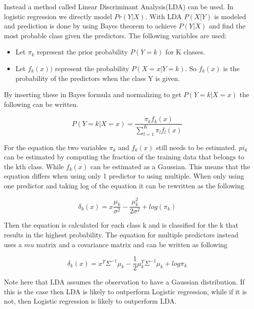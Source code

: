 Instead a method called Linear Discriminant Analysis(LDA) can be used. In logistic regression we directly model $Pr(Y|X)$. With LDA $P(X|Y)$ is modeled and prediction is done by using Bayes theorem to achieve $P(Y|X)$ and find the most probable class given the predictors. The following variables are used:

\begin{itemize}
	\item Let $\pi_k$ represent the prior probability $P(Y=k)$ for K classes.
	\item Let $f_k(x))$ represent the probability $P(X=x|Y=k)$. So $f_k(x)$ is the probability of the predictors when the class Y is given.
\end{itemize} 

By inserting these in Bayes formula and normalizing to get $P(Y=k|X=x)$ the following can be written.

\begin{equation}
P(Y=k|X = x) = \dfrac{\pi_k f_k(x)}{\sum_{l=1}^{K} \pi_l f_l(x)}
\end{equation}

For the equation the two variables $\pi_k$ and $f_k(x)$ still needs to be estimated. $pi_k$ can be estimated by computing the fraction of the training data that belongs to the kth class. While $f_k(x)$ can be estimated as a Gaussian. This means that the equation differs when using only 1 predictor to using multiple. When only using one predictor and taking log of the equation it can be rewritten as the following

\begin{equation}
\delta_k(x) = x  \dfrac{\mu_k}{\sigma^2} - \dfrac{\mu_k^2}{2\sigma^2} + log(\pi_k)
\end{equation}

Then the equation is calculated for each class k and is classified for the k that results in the highest probability. The equation for multiple predictors instead uses a $mu$ matrix and a covariance matrix and can be written as following

\begin{equation}
\delta_k(x) = x^T \Sigma^{-1} \mu_k -  \frac{1}{2} \mu_k^{T} \Sigma^{-1} \mu_k + log \pi_k
\end{equation}

Note here that LDA assumes the observation to have a Gaussian distribution. If this is the case then LDA is likely to outperform Logistic regression, while if it is not, then Logistic regression is likely to outperform LDA. 

